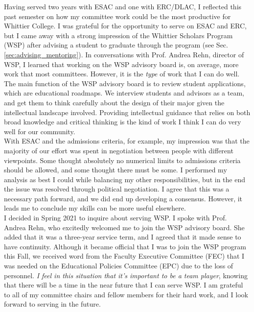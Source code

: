 \documentclass[../../../main.tex]{subfiles}
\begin{document}
Having served two years with ESAC and one with ERC/DLAC, I reflected this past semester on how my committee work could be the most productive for Whittier College.  I was grateful for the opportunity to serve on ESAC and ERC, but I came away with a strong impression of the Whittier Scholars Program (WSP) after advising a student to graduate through the program (see Sec. \ref{sec:advising_mentoring}).  In conversations with Prof. Andrea Rehn, director of WSP, I learned that working on the WSP advisory board is, on average, more work that most committees.  However, it is the \textit{type} of work that I can do well.  The main function of the WSP advisory board is to review student applications, which are educational roadmaps.  We interview students and advisors as a team, and get them to think carefully about the design of their major given the intellectual landscape involved.  Providing intellectual guidance that relies on both broad knowledge and critical thinking is the kind of work I think I can do very well for our community.
\\
\vspace{0.25cm}
With ESAC and the admissions criteria, for example, my impression was that the majority of our effort was spent in negotiation between people with different viewpoints.  Some thought absolutely no numerical limits to admissions criteria should be allowed, and some thought there must be some.  I performed my analysis as best I could while balancing my other responsibilities, but in the end the issue was resolved through political negotiation.  I agree that this was a necessary path forward, and we did end up developing a consensus.  However, it leads me to conclude my skills can be more useful elsewhere.
\\
\vspace{0.25cm}
I decided in Spring 2021 to inquire about serving WSP.  I spoke with Prof. Andrea Rehn, who excitedly welcomed me to join the WSP advisory board.  She added that it was a three-year service term, and I agreed that it made sense to have continuity.  Although it became official that I was to join the WSP program this Fall, we received word from the Faculty Executive Committee (FEC) that I was needed on the Educational Policies Committee (EPC) due to the loss of personnel.  \textit{I feel in this situation that it's important to be a team player}, knowing that there will be a time in the near future that I can serve WSP.  I am grateful to all of my committee chairs and fellow members for their hard work, and I look forward to serving in the future.
\end{document}
